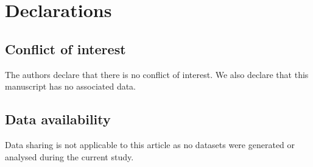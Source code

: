 \documentclass[11pt,reqno]{amsart}
\numberwithin{equation}{section}
\begin{document}
\section*{Declarations}
\subsection*{Conflict of interest} The authors declare that there is no conflict of interest. We also declare that this
manuscript has no associated data.

\subsection*{Data availability} Data sharing is not applicable to this article as no datasets were generated or analysed
during the current study.
\end{document}
